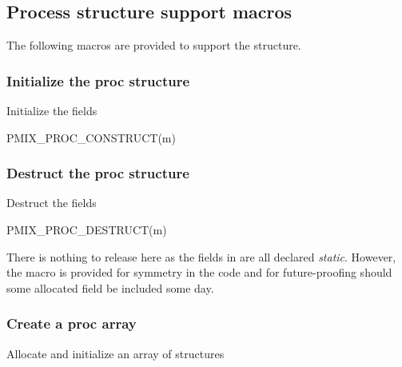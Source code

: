\subsection{Process structure support macros}
The following macros are provided to support the  structure.

\subsubsection{Initialize the proc structure}

Initialize the  fields

\cspecificstart
\begin{codepar}
PMIX_PROC_CONSTRUCT(m)
\end{codepar}
\cspecificend

\begin{arglist}
\end{arglist}

\subsubsection{Destruct the proc structure}

Destruct the  fields

\cspecificstart
\begin{codepar}
PMIX_PROC_DESTRUCT(m)
\end{codepar}
\cspecificend

\begin{arglist}
\end{arglist}

There is nothing to release here as the fields in  are all declared \emph{static}. However, the macro is provided for symmetry in the code and for future-proofing should some allocated field be included some day.

\subsubsection{Create a proc array}

Allocate and initialize an array of  structures

